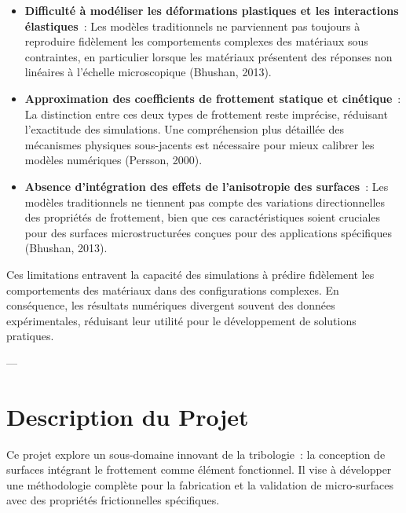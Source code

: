\begin{itemize}
    \item \textbf{Difficulté à modéliser les déformations plastiques et les interactions élastiques} :
    Les modèles traditionnels ne parviennent pas toujours à reproduire fidèlement les comportements complexes des matériaux sous contraintes, en particulier lorsque les matériaux présentent des réponses non linéaires à l’échelle microscopique (Bhushan, 2013).
    
    \item \textbf{Approximation des coefficients de frottement statique et cinétique} :
    La distinction entre ces deux types de frottement reste imprécise, réduisant l’exactitude des simulations. Une compréhension plus détaillée des mécanismes physiques sous-jacents est nécessaire pour mieux calibrer les modèles numériques (Persson, 2000).
    
    \item \textbf{Absence d’intégration des effets de l’anisotropie des surfaces} :
    Les modèles traditionnels ne tiennent pas compte des variations directionnelles des propriétés de frottement, bien que ces caractéristiques soient cruciales pour des surfaces microstructurées conçues pour des applications spécifiques (Bhushan, 2013).
\end{itemize}

Ces limitations entravent la capacité des simulations à prédire fidèlement les comportements des matériaux dans des configurations complexes. En conséquence, les résultats numériques divergent souvent des données expérimentales, réduisant leur utilité pour le développement de solutions pratiques.

---

\section*{Description du Projet}

Ce projet explore un sous-domaine innovant de la tribologie : la conception de surfaces intégrant le frottement comme élément fonctionnel. Il vise à développer une méthodologie complète pour la fabrication et la validation de micro-surfaces avec des propriétés frictionnelles spécifiques.


